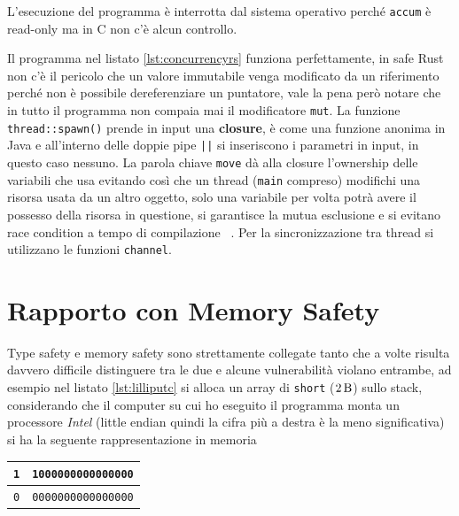\documentclass[Lau,binding=0.6cm]{sapthesis}
\newcommand{\textcode}[1]{\colorbox{backcolour}{\texttt{#1}}}
\begin{document}
L'esecuzione del programma è interrotta dal sistema operativo perché \textcode{accum} è read-only ma in C non c'è alcun controllo.




Il programma nel listato \ref{lst:concurrencyrs} funziona perfettamente, in safe Rust non c'è il pericolo che un valore immutabile venga modificato da un riferimento perché non è possibile dereferenziare un puntatore, vale la pena però notare che in tutto il programma non compaia mai il modificatore \textcode{mut}. La funzione \textcode{thread::spawn()} prende in input una \textbf{closure}, è come una funzione anonima in Java e all'interno delle doppie pipe \textcode{||} si inseriscono i parametri in input, in questo caso nessuno. 
La parola chiave \textcode{move} dà alla closure l'ownership delle variabili che usa evitando così che un thread (\textcode{main} compreso) modifichi una risorsa usata da un altro oggetto, solo una variabile per volta potrà avere il possesso della risorsa in questione, si garantisce la mutua esclusione e si evitano race condition a tempo di compilazione ~\cite[5.6]{rust:language_2}. 
Per la sincronizzazione tra thread si utilizzano le funzioni \colorbox{backcolour}{\texttt{channel}}. 




\section{Rapporto con Memory Safety}
Type safety e memory safety sono strettamente collegate tanto che a volte risulta davvero difficile distinguere tra le due e alcune vulnerabilità violano entrambe, ad esempio nel listato \ref{lst:lilliputc} si alloca un array di \textcode{short} ($ \SI{2}{\byte} $) sullo stack, considerando che il computer su cui ho eseguito il programma monta un processore \textit{Intel} (little endian quindi la cifra più a destra è la meno significativa) si ha la seguente rappresentazione in memoria

\begin{table}[H]
	\label{fig:mem_type_stack}
	\centering
	\begin{tabular}{|c|c|}
		\hline
		\texttt{1} & \texttt{1000000000000000} \\
		\hline 
		\texttt{0} & \texttt{0000000000000000} \\
		\hline
	\end{tabular}
\end{table}
\end{document}

